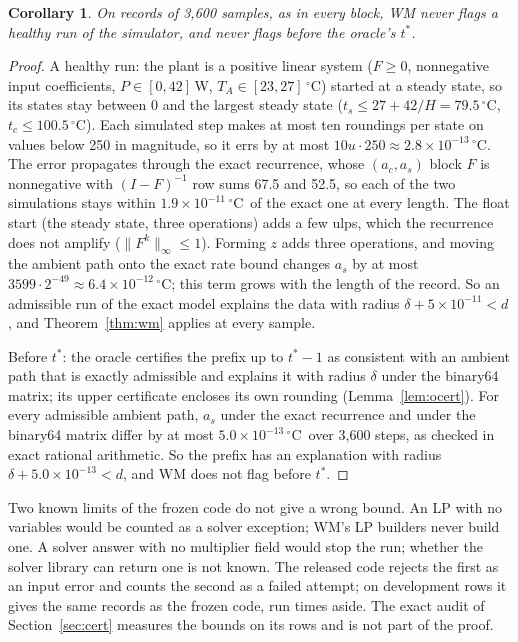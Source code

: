 \documentclass[11pt,a4paper]{article}
\newtheorem{acorollary}[alemma]{Corollary}
\newcommand{\degC}{\ensuremath{{}^\circ}C}
\newcommand{\sci}[2]{\ensuremath{#1\times10^{#2}}}
\newcommand{\tstar}{t^{\ast}}
\begin{document}
\begin{acorollary}\label{cor:wm}
On records of 3,600 samples, as in every block, WM never flags a healthy run of the simulator, and never flags before
the oracle's $\tstar$.
\end{acorollary}
\begin{proof}
A healthy run: the plant is a positive linear system ($F\ge0$, nonnegative input coefficients, $P\in[0,42]$\,W,
$T_A\in[23,27]$\,\degC) started at a steady state, so its states stay between 0 and the largest steady state
($t_s\le 27+42/H = 79.5$\,\degC, $t_c\le 100.5$\,\degC). Each simulated step makes at most ten roundings per state on
values below 250 in magnitude, so it errs
by at most $10u\cdot250\approx\sci{2.8}{-13}$\,\degC. The error propagates through the exact recurrence, whose
$(a_c, a_s)$ block $F$ is nonnegative with $(I-F)^{-1}$ row sums 67.5 and 52.5, so each of the two simulations stays
within \sci{1.9}{-11}\,\degC\ of the exact one at every length. The float start (the steady state, three operations)
adds a few ulps, which the recurrence does not amplify ($\|F^k\|_\infty\le1$). Forming $z$ adds three operations, and moving the ambient
path onto the exact rate bound changes $a_s$ by at most $3599\cdot2^{-49}\approx\sci{6.4}{-12}$\,\degC; this term grows
with the length of the record. So an admissible run of the exact model
explains the data with radius $\delta + \sci{5}{-11} < d$, and Theorem~\ref{thm:wm} applies at every sample.

Before $\tstar$: the oracle certifies the prefix up to $\tstar-1$ as consistent with an ambient path that is exactly
admissible and explains it with radius $\delta$ under the binary64 matrix; its upper certificate encloses its own
rounding (Lemma~\ref{lem:ocert}). For every admissible ambient path, $a_s$ under the exact recurrence and under the binary64 matrix differ by
at most \sci{5.0}{-13}\,\degC\ over 3,600 steps, as checked in exact rational arithmetic. So the prefix has an
explanation with radius $\delta + \sci{5.0}{-13} < d$, and WM does not flag before $\tstar$.
\end{proof}

Two known limits of the frozen code do not give a wrong bound. An LP with no variables would be counted as a solver
exception; WM's LP builders never build one. A solver answer with no multiplier field would stop the run; whether the
solver library can return one is not known. The released code rejects the first as an input error and counts the
second as a failed attempt; on development rows it gives the same records as the frozen code, run times aside. The exact audit of Section~\ref{sec:cert} measures the bounds on its rows
and is not part of the proof.
\end{document}
